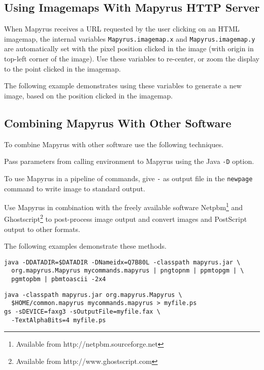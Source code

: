 \subsection{Using Imagemaps With Mapyrus HTTP Server}

When Mapyrus receives a URL requested by the user
clicking on an HTML imagemap, the
internal variables
\texttt{Mapyrus.imagemap.x} and
\texttt{Mapyrus.imagemap.y} are automatically set with the pixel position
clicked in the image (with origin in top-left corner of the image).
Use these variables to re-center, or zoom the display to the
point clicked in the imagemap.

The following example demonstrates
using these variables to generate a new image, based on the
position clicked in the imagemap.



\subsection{Combining Mapyrus With Other Software}

To combine Mapyrus with other software use the following
techniques.

Pass parameters from calling environment to Mapyrus using the Java
\texttt{-D} option.

To use Mapyrus in a pipeline of commands,
give \texttt{-} as output file in the
\texttt{newpage}
command to write image to standard output.

Use Mapyrus in combination with the freely available software
Netpbm\footnote{Available from http://netpbm.sourceforge.net} and
Ghostscript\footnote{Available from http://www.ghostscript.com} to post-process
image output and convert images and PostScript output to other formats.

The following examples demonstrate these methods.

\begin{verbatim}
java -DDATADIR=$DATADIR -DNameidx=Q7B80L -classpath mapyrus.jar \
  org.mapyrus.Mapyrus mycommands.mapyrus | pngtopnm | ppmtopgm | \
  pgmtopbm | pbmtoascii -2x4
\end{verbatim}

\begin{verbatim}
java -classpath mapyrus.jar org.mapyrus.Mapyrus \
  $HOME/common.mapyrus mycommands.mapyrus > myfile.ps
gs -sDEVICE=faxg3 -sOutputFile=myfile.fax \
  -TextAlphaBits=4 myfile.ps
\end{verbatim}

